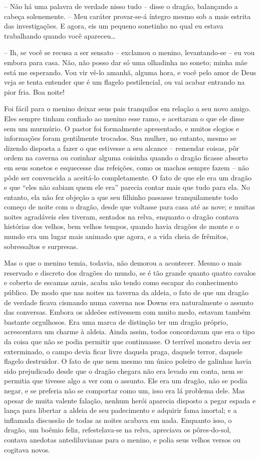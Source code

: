 -- Não há uma palavra de verdade nisso tudo -- disse o dragão,
balançando a cabeça solenemente. -- Meu caráter provar-se-á íntegro
mesmo sob a mais estrita das investigações. E agora, eis um pequeno
sonetinho no qual eu estava trabalhando quando você apareceu…

-- Ih, se você se recusa a ser sensato -- exclamou o menino,
levantando-se -- eu vou embora para casa. Não, não posso dar só uma
olhadinha no soneto; minha mãe está me esperando. Vou vir vê-lo
amanhã, alguma hora, e você pelo amor de Deus veja se tenta entender
que é um flagelo pestilencial, ou vai acabar entrando na pior fria.
Boa noite!

Foi fácil para o menino deixar seus pais tranquilos em relação a seu
novo amigo. Eles sempre tinham confiado ao menino esse ramo, e
aceitaram o que ele disse sem um murmúrio. O pastor foi formalmente
apresentado, e muitos elogios e informações foram gentilmente
trocados. Sua mulher, no entanto, mesmo se dizendo disposta a fazer o
que estivesse a seu alcance -- remendar coisas, pôr ordem na caverna
ou cozinhar alguma coisinha quando o dragão ficasse absorto em seus
sonetos e esquecesse das refeições, como os machos sempre fazem -- não
pôde ser convencida a aceitá-lo completamente. O fato de que ele era
um dragão e que “eles não sabiam quem ele era” parecia contar mais
que tudo para ela. No entanto, ela não fez objeção a que seu filhinho
passasse tranquilamente todo começo de noite com o dragão, desde que
voltasse para casa até as nove; e muitas noites agradáveis eles
tiveram, sentados na relva, enquanto o dragão contava histórias dos
velhos, bem velhos tempos, quando havia dragões de monte e o mundo
era um lugar mais animado que agora, e a vida cheia de frêmitos,
sobressaltos e surpresas.

Mas o que o menino temia, todavia, não demorou a acontecer. Mesmo o
mais reservado e discreto dos dragões do mundo, se é tão grande
quanto quatro cavalos e coberto de escamas azuis, acaba não tendo
como escapar do conhecimento público. De modo que nas noites na
taverna da aldeia, o fato de que um dragão de verdade ficava cismando
numa caverna nos Downs era naturalmente o assunto das conversas.
Embora os aldeões estivessem com muito medo, estavam também bastante
orgulhosos. Era uma marca de distinção ter um dragão próprio,
acrescentava um charme à aldeia. Ainda assim, todos concordavam que
era o tipo da coisa que não se podia permitir que continuasse. O
terrível monstro devia ser exterminado, o campo devia ficar livre
daquela praga, daquele terror, daquele flagelo destruidor. O fato de
que nem mesmo um único poleiro de galinhas havia sido prejudicado
desde que o dragão chegara não era levado em conta, nem se permitia
que tivesse algo a ver com o assunto. Ele era um dragão, não se podia
negar, e se preferia não se comportar como um, isso era lá problema
dele. Mas apesar de muita valente falação, nenhum herói aparecia
disposto a pegar espada e lança para libertar a aldeia de seu
padecimento e adquirir fama imortal; e a inflamada discussão de todas
as noites acabava em nada. Enquanto isso, o dragão, um boêmio feliz,
refestelava-se na relva, apreciava os pôres-do-sol, contava anedotas
antediluvianas para o menino, e polia seus velhos versos ou cogitava
novos.

